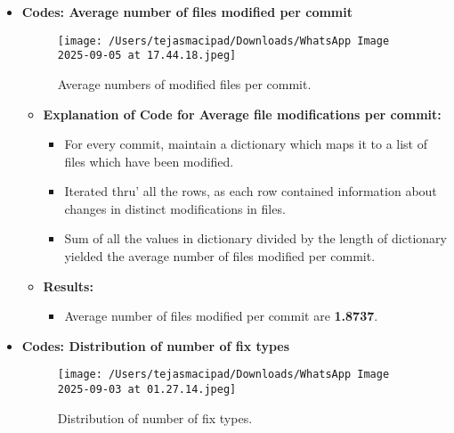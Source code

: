 \documentclass[12pt, a4paper]{report}
\begin{document}
\begin{itemize}
    \item \textbf{Codes: Average number of files modified per commit}
        \begin{figure}[h!]
            \centering
            \texttt{[image: /Users/tejasmacipad/Downloads/WhatsApp Image 2025-09-05 at 17.44.18.jpeg]}
            \caption{Average numbers of modified files per commit.}
            \label{fig:diff-example-2}
        \end{figure}

        \begin{itemize}
            \item \textbf{Explanation of Code for Average file modifications per commit:}
            \begin{itemize}
                \item For every commit, maintain a dictionary which maps it to a list of files which have been modified.
                \item Iterated thru' all the rows, as each row contained information about changes in distinct modifications in files.
                \item Sum of all the values in dictionary divided by the length of dictionary yielded the average number of files modified per commit.
            \end{itemize}
        \end{itemize}

        \begin{itemize}
            \item \textbf{Results:}
            \begin{itemize}
                \item Average number of files modified per commit are \textbf{1.8737}.
            \end{itemize}
        \end{itemize}

    \item \textbf{Codes: Distribution of number of fix types}
        \begin{figure}[h!]
            \centering
            \texttt{[image: /Users/tejasmacipad/Downloads/WhatsApp Image 2025-09-03 at 01.27.14.jpeg]}
            \caption{Distribution of number of fix types.}
            \label{fig:diff-example-3}
        \end{figure}


\end{itemize}
\end{document}
